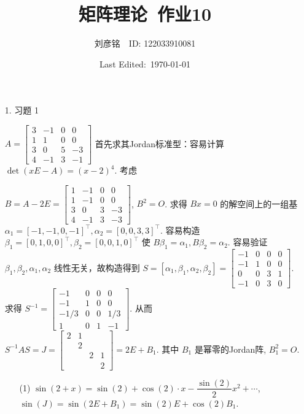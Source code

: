 \documentclass{article}
\title{矩阵理论\ 作业10}
\author{刘彦铭\ \ ID: 122033910081}
\date{Last Edited:\ \today}
\begin{document}
\maketitle

\begin{spacing}{1.5}
    
\begin{itemize}
    \item [1.] 习题 1
    
    $A = \left[\begin{array}{cccc}3&-1&0&0\\1&1&0&0\\3&0&5&-3\\4&-1&3&-1\end{array}\right]$ 首先求其Jordan标准型：容易计算 $\det(xE-A) = (x-2)^4$. 考虑 
    
    $B = A - 2E = \left[\begin{array}{cccc}1&-1&0&0\\1&-1&0&0\\3&0&3&-3\\4&-1&3&-3\end{array}\right]$, $B^2 = O$. 求得 $Bx=0$ 的解空间上的一组基 $\alpha_1 = [-1, -1, 0, -1]^\top, \alpha_2=[0, 0, 3, 3]^\top$. 容易构造 $\beta_1 = [0, 1, 0, 0]^\top, \beta_2 = [0, 0, 1, 0]^\top$ 使 $B\beta_1 = \alpha_1, B\beta_2 = \alpha_2$. 容易验证 $\beta_1, \beta_2, \alpha_1, \alpha_2$ 线性无关，故构造得到 $S = [\alpha_1, \beta_1, \alpha_2, \beta_2] = \left[\begin{array}{cccc}-1&0&0&0\\-1&1&0&0\\0&0&3&1\\-1&0&3&0\end{array}\right]$. 求得 $S^{-1} = \left[\begin{array}{cccc}-1&0&0&0\\-1&1&0&0\\-1/3&0&0&1/3\\1&0&1&-1\end{array}\right]$. 从而 $S^{-1}AS = J = \left[\begin{array}{cccc}2&1&&\\&2&&\\&&2&1\\&&&2\end{array}\right] = 2E + B_1$. 其中 $B_1$ 是幂零的Jordan阵, $B_1^2=O$.

    \begin{itemize}
        \item [(1)] $\sin(2 + x) = \sin(2) + \cos(2) \cdot x - \dfrac{\sin(2)}{2}x^2 + \cdots$, $\sin(J) = \sin(2 E + B_1) = \sin(2)E + \cos(2) B_1$. 
        

\end{itemize}
\end{itemize}
\end{spacing}
\end{document}
